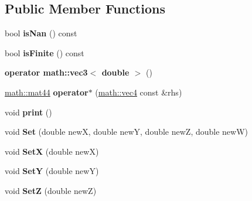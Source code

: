 \subsection*{Public Member Functions}
\begin{DoxyCompactItemize}
\item 
\hypertarget{classmath_1_1vec4_a140975d6e39a5a36c81856c5ed5333d0}{
bool {\bfseries isNan} () const }
\label{classmath_1_1vec4_a140975d6e39a5a36c81856c5ed5333d0}

\item 
\hypertarget{classmath_1_1vec4_af9978d557d5797a13f36357df993f5d4}{
bool {\bfseries isFinite} () const }
\label{classmath_1_1vec4_af9978d557d5797a13f36357df993f5d4}

\item 
\hypertarget{classmath_1_1vec4_a55d749f579d6cc30112a70d31d53525f}{
{\bfseries operator math::vec3$<$ double $>$} ()}
\label{classmath_1_1vec4_a55d749f579d6cc30112a70d31d53525f}

\item 
\hypertarget{classmath_1_1vec4_aa0395ebcf402c952539e233cb02994d3}{
\hyperlink{classmath_1_1mat44}{math::mat44} {\bfseries operator$\ast$} (\hyperlink{classmath_1_1vec4}{math::vec4} const \&rhs)}
\label{classmath_1_1vec4_aa0395ebcf402c952539e233cb02994d3}

\item 
\hypertarget{classmath_1_1vec4_a48e9b9e91a4ff955973b346b957337c6}{
void {\bfseries print} ()}
\label{classmath_1_1vec4_a48e9b9e91a4ff955973b346b957337c6}

\item 
\hypertarget{classmath_1_1vec4_aa86f0c779dd17ea5d560ba1761ddb874}{
void {\bfseries Set} (double newX, double newY, double newZ, double newW)}
\label{classmath_1_1vec4_aa86f0c779dd17ea5d560ba1761ddb874}

\item 
\hypertarget{classmath_1_1vec4_a9209923001bafe10977eb38146b0f197}{
void {\bfseries SetX} (double newX)}
\label{classmath_1_1vec4_a9209923001bafe10977eb38146b0f197}

\item 
\hypertarget{classmath_1_1vec4_a6eb3274e3cdbbfdbdfd2c6b284c00777}{
void {\bfseries SetY} (double newY)}
\label{classmath_1_1vec4_a6eb3274e3cdbbfdbdfd2c6b284c00777}

\item 
\hypertarget{classmath_1_1vec4_ae5141268c477adf4e86e55a80977cb03}{
void {\bfseries SetZ} (double newZ)}
\label{classmath_1_1vec4_ae5141268c477adf4e86e55a80977cb03}


\end{DoxyCompactItemize}
